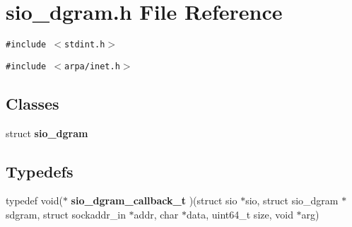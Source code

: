 \section{sio\_\-dgram.h File Reference}
\label{sio__dgram_8h}
{\tt \#include $<$stdint.h$>$}\par
{\tt \#include $<$arpa/inet.h$>$}\par
\subsection*{Classes}
\begin{CompactItemize}
\item 
struct {\bf sio\_\-dgram}
\end{CompactItemize}
\subsection*{Typedefs}
\begin{CompactItemize}
\item 
typedef void($\ast$ {\bf sio\_\-dgram\_\-callback\_\-t} )(struct sio $\ast$sio, struct sio\_\-dgram $\ast$sdgram, struct sockaddr\_\-in $\ast$addr, char $\ast$data, uint64\_\-t size, void $\ast$arg)\label{sio__dgram_8h_a0}

\end{CompactItemize}
